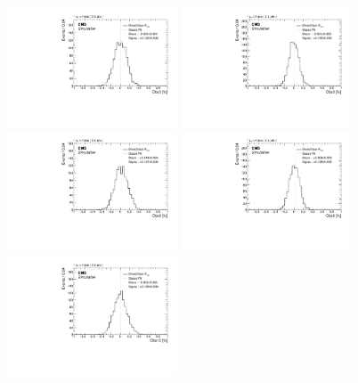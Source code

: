 \begin{figure}
    \centering
    \includegraphics[width=0.45\textwidth]{figure/SimAcp_17_el_Obs3_Acp_10_mixed.pdf}
    \includegraphics[width=0.45\textwidth]{figure/SimAcp_17_mu_Obs3_Acp_10_mixed.pdf}
    \includegraphics[width=0.45\textwidth]{figure/SimAcp_17_el_Obs6_Acp_10_mixed.pdf}
    \includegraphics[width=0.45\textwidth]{figure/SimAcp_17_mu_Obs6_Acp_10_mixed.pdf}
    \includegraphics[width=0.45\textwidth]{figure/SimAcp_17_el_Obs12_Acp_10_mixed.pdf}

\end{figure}
